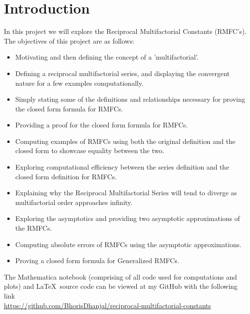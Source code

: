 \documentclass[12pt]{article}
\numberwithin{equation}{section}
\begin{document}
\section{Introduction} %
In this project we will explore the Reciprocal Multifactorial Constants (RMFC's).
The objectives of this project are as follows:
\begin{itemize}
    \item Motivating and then defining the concept of a 'multifactorial'.
    \item Defining a reciprocal multifactorial series, and displaying the convergent nature for a few examples computationally.
    \item Simply stating some of the definitions and relationships necessary for proving the closed form formula for RMFCs.
    \item Providing a proof for the closed form formula for RMFCs.
    \item Computing examples of RMFCs using both the original definition and the closed form to showcase equality between the two.
    \item Exploring computational efficiency between the series definition and the closed form definition for RMFCs.
    \item Explaining why the Reciprocal Multifactorial Series will tend to diverge as multifactorial order approaches infinity. 
    \item Exploring the asymptotics and providing two asymptotic approximations of the RMFCs.
    \item Computing absolute errors of RMFCs using the asymptotic approximations.
    \item Proving a closed form formula for Generalized RMFCs.
\end{itemize}\par
The Mathematica notebook (comprising of all code used for computations and plots) and \LaTeX \ source code can be viewed at my GitHub with the following link\\
\href{https://github.com/BhorisDhanjal/reciprocal-multifactorial-constants}{\faGithubSquare} \href{https://github.com/BhorisDhanjal/reciprocral-multifactorial-constants}{https://github.com/BhorisDhanjal/reciprocal-multifactorial-constants}
\vfill


\end{document}
